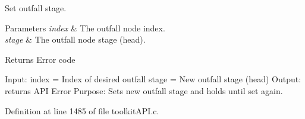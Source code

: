 Set outfall stage. 


\begin{DoxyParams}{Parameters}
{\em index} & The outfall node index. \\
\hline
{\em stage} & The outfall node stage (head). \\
\hline
\end{DoxyParams}
\begin{DoxyReturn}{Returns}
Error code
\end{DoxyReturn}
Input\+: index = Index of desired outfall stage = New outfall stage (head) Output\+: returns A\+PI Error Purpose\+: Sets new outfall stage and holds until set again. 

Definition at line 1485 of file toolkit\+A\+P\+I.\+c.

